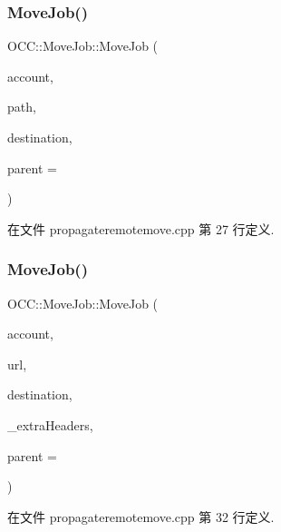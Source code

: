 \subsubsection{\texorpdfstring{Move\+Job()}{MoveJob()}\hspace{0.1cm}{\footnotesize\ttfamily [1/2]}}
{\footnotesize\ttfamily O\+C\+C\+::\+Move\+Job\+::\+Move\+Job (\begin{DoxyParamCaption}\item[{\hyperlink{namespace_o_c_c_a848616aedb9188e223c6b9867757fe69}{Account\+Ptr}}]{account,  }\item[{const Q\+String \&}]{path,  }\item[{const Q\+String \&}]{destination,  }\item[{Q\+Object $\ast$}]{parent = {} }\end{DoxyParamCaption})\hspace{0.3cm}{\ttfamily [explicit]}}



在文件 propagateremotemove.\+cpp 第 27 行定义.

\mbox{\label{class_o_c_c_1_1_move_job_a49524ca05a8c6e8ffc4518aec27a2b01}} 
\subsubsection{\texorpdfstring{Move\+Job()}{MoveJob()}\hspace{0.1cm}{\footnotesize\ttfamily [2/2]}}
{\footnotesize\ttfamily O\+C\+C\+::\+Move\+Job\+::\+Move\+Job (\begin{DoxyParamCaption}\item[{\hyperlink{namespace_o_c_c_a848616aedb9188e223c6b9867757fe69}{Account\+Ptr}}]{account,  }\item[{const Q\+Url \&}]{url,  }\item[{const Q\+String \&}]{destination,  }\item[{Q\+Map$<$ Q\+Byte\+Array, Q\+Byte\+Array $>$}]{\+\_\+extra\+Headers,  }\item[{Q\+Object $\ast$}]{parent = {} }\end{DoxyParamCaption})\hspace{0.3cm}{\ttfamily [explicit]}}



在文件 propagateremotemove.\+cpp 第 32 行定义.



